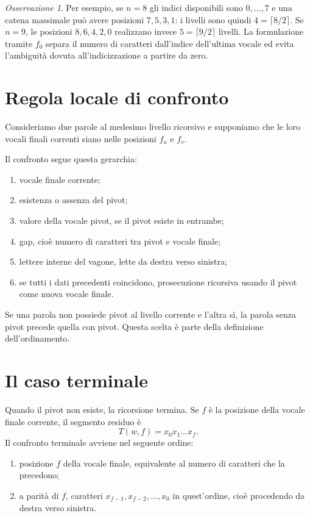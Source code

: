 \documentclass[11pt,a4paper]{article}
\theoremstyle{definition}
\theoremstyle{remark}
\newtheorem{osservazione}[teorema]{Osservazione}
\begin{document}
\begin{osservazione}
Per esempio, se $n=8$ gli indici disponibili sono $0,\dots,7$ e una catena massimale può avere posizioni $7,5,3,1$: i livelli sono quindi $4=\lceil8/2\rceil$. Se $n=9$, le posizioni $8,6,4,2,0$ realizzano invece $5=\lceil9/2\rceil$ livelli. La formulazione tramite $f_0$ separa il numero di caratteri dall'indice dell'ultima vocale ed evita l'ambiguità dovuta all'indicizzazione a partire da zero.
\end{osservazione}

\section{Regola locale di confronto}

Consideriamo due parole al medesimo livello ricorsivo e supponiamo che le loro vocali finali correnti siano nelle posizioni $f_u$ e $f_v$.

Il confronto segue questa gerarchia:
\begin{enumerate}[label=\arabic*.]
  \item vocale finale corrente;
  \item esistenza o assenza del pivot;
  \item valore della vocale pivot, se il pivot esiste in entrambe;
  \item gap, cioè numero di caratteri tra pivot e vocale finale;
  \item lettere interne del vagone, lette da destra verso sinistra;
  \item se tutti i dati precedenti coincidono, prosecuzione ricorsiva usando il pivot come nuova vocale finale.
\end{enumerate}

Se una parola non possiede pivot al livello corrente e l'altra sì, la parola senza pivot precede quella con pivot. Questa scelta è parte della definizione dell'ordinamento.

\section{Il caso terminale}

Quando il pivot non esiste, la ricorsione termina. Se $f$ è la posizione della vocale finale corrente, il segmento residuo è
\[
  T(w,f)=x_0x_1\dots x_f.
\]
Il confronto terminale avviene nel seguente ordine:
\begin{enumerate}[label=\arabic*.]
  \item posizione $f$ della vocale finale, equivalente al numero di caratteri che la precedono;
  \item a parità di $f$, caratteri $x_{f-1},x_{f-2},\dots,x_0$ in quest'ordine, cioè procedendo da destra verso sinistra.
\end{enumerate}
\end{document}
